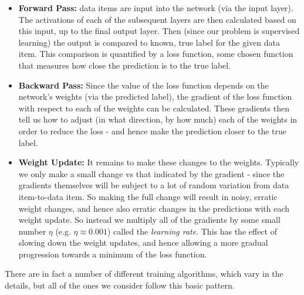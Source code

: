 \documentclass[11pt]{article} %
\theoremstyle{plain}
\theoremstyle{definition}
\begin{document}
\begin{itemize}
  \item \textbf{Forward Pass:} data items are input into the network (via the input layer). The activations of each of the subsequent layers are then calculated based on this input, up to the final output layer. Then (since our problem is supervised learning) the output is compared to known, true label for the given data item. This comparison is quantified by a loss function, some chosen function that measures how close the prediction is to the true label.   
  \item \textbf{Backward Pass:} Since the value of the loss function depends on the network's weights (via the predicted label), the gradient of the loss function with respect to each of the weights can be calculated. These gradients then tell us how to adjust (in what direction, by how much) each of the weights in order to reduce the loss - and hence make the prediction closer to the true label.
  \item \textbf{Weight Update:} It remains to make these changes to the weights. Typically we only make a small change vs that indicated by the gradient - since the gradients themselves will be subject to a lot of random variation from data item-to-data item. So making the full change will result in noisy, erratic weight changes, and hence also erratic changes in the predictions with each weight update. So instead we multiply all of the gradients by some small number \(\eta\) (e.g. \(\eta\approx0.001\)) called the \textit{learning rate}. This has the effect of slowing down the weight updates, and hence allowing a more gradual progression towards a minimum of the loss function. 
\end{itemize}
There are in fact a number of different training algorithms, which vary in the details, but all of the ones we consider follow this basic pattern.
\end{document}

